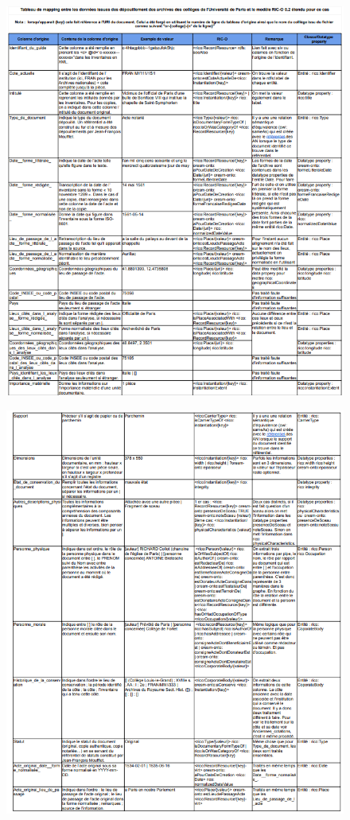 \label{mapping}
\begin{figure}[!h]
    \centering
    \includegraphics[height=1\linewidth]{annexes/mapping1.png}
\end{figure}
\begin{figure}[!h]
    \centering
    \includegraphics[width=1\linewidth]{annexes/mapping2.png}
\end{figure}
